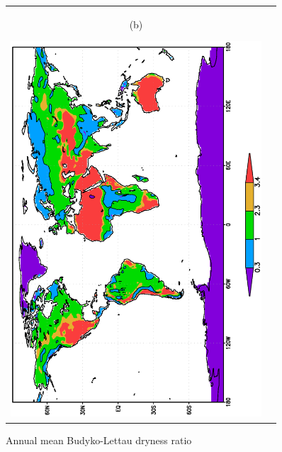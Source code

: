 \documentclass[12pt,a4paper,twoside,openright,headinclude,liststotoc,bibtotoc]{scrreprt}
\begin{document}
\begin{figure}[b]
\begin{tabular}{cc}
\begin{minipage}{1.0\textwidth}
\begin{center}
\begin{scriptsize}(b)\end{scriptsize}\hspace{-1cm}\includegraphics[height=14.0cm,angle=-90]{eps/budyko_ERA40_ANMnn.eps}
\end{center}
\end{minipage}
\end{tabular}
\caption[Annual mean Budyko-Lettau dryness ratio]{Annual mean Budyko-Lettau dryness ratio}
\label{img:budyko}
\end{figure}
\end{document}
